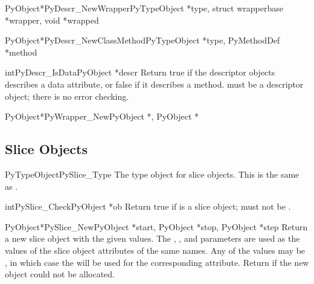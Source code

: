 \begin{cfuncdesc}{PyObject*}{PyDescr_NewWrapper}{PyTypeObject *type,
						 struct wrapperbase *wrapper,
                                                 void *wrapped}
\end{cfuncdesc}

\begin{cfuncdesc}{PyObject*}{PyDescr_NewClassMethod}{PyTypeObject *type,
						     PyMethodDef *method}
\end{cfuncdesc}

\begin{cfuncdesc}{int}{PyDescr_IsData}{PyObject *descr}
  Return true if the descriptor objects  describes a data
  attribute, or false if it describes a method.   must be a
  descriptor object; there is no error checking.
\end{cfuncdesc}

\begin{cfuncdesc}{PyObject*}{PyWrapper_New}{PyObject *, PyObject *}
\end{cfuncdesc}


\subsection{Slice Objects \label{slice-objects}}

\begin{cvardesc}{PyTypeObject}{PySlice_Type}
  The type object for slice objects.  This is the same as
  .
\end{cvardesc}

\begin{cfuncdesc}{int}{PySlice_Check}{PyObject *ob}
  Return true if  is a slice object;  must not be
  \NULL{}.
\end{cfuncdesc}

\begin{cfuncdesc}{PyObject*}{PySlice_New}{PyObject *start, PyObject *stop,
                                          PyObject *step}
  Return a new slice object with the given values.  The ,
  , and  parameters are used as the values of the
  slice object attributes of the same names.  Any of the values may be
  \NULL{}, in which case the  will be used for the
  corresponding attribute.  Return \NULL{} if the new object could
  not be allocated.
\end{cfuncdesc}

